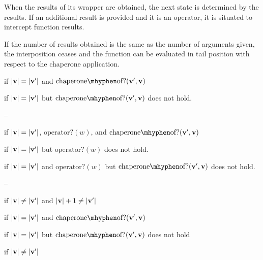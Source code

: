 
When the results of its wrapper are obtained, the next state is determined by the results.
If an additional result is provided and it is an operator, it is situated to intercept function results.

If the number of results obtained is the same as the number of arguments given, the interposition ceases and the function can be evaluated in tail position with respect to the chaperone application.

if $|\mathbf{v}|=|\mathbf{v'}|$ and $\mathrm{chaperone\mhyphen of?}(\vvp,\vv)$

if $|\mathbf{v}|=|\mathbf{v'}|$ but $\mathrm{chaperone\mhyphen of?}(\vvp,\vv)$ does not hold.

--

if $|\mathbf{v}|=|\mathbf{v'}|$, $\mathrm{operator?}(w)$, and $\mathrm{chaperone\mhyphen of?}(\vvp,\vv)$

if $|\mathbf{v}|=|\mathbf{v'}|$ but $\mathrm{operator?}(w)$ does not hold.

if $|\mathbf{v}|=|\mathbf{v'}|$ and $\mathrm{operator?}(w)$ but $\mathrm{chaperone\mhyphen of?}(\vvp,\vv)$ does not hold.

--

if $|\mathbf{v}|\ne|\mathbf{v'}|$ and $|\mathbf{v}|+1\ne|\mathbf{v'}|$







\red{\sval{\chacrk{\vv}::\ks}{\sigma}{\vvp}}{\sval{\ks}{\sigma}{\vvp}}
if $|\mathbf{v}|=|\mathbf{v'}|$ and $\mathrm{chaperone\mhyphen of?}(\vvp,\vv)$

if $|\mathbf{v}|=|\mathbf{v'}|$ but $\mathrm{chaperone\mhyphen of?}(\vvp,\vv)$ does not hold

if $|\mathbf{v}|\ne|\mathbf{v'}|$

